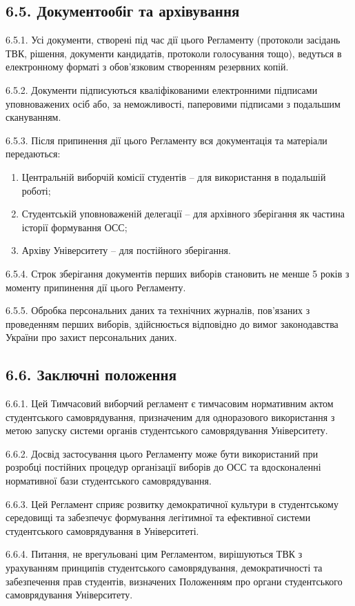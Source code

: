 \subsection*{6.5. Документообіг та архівування}
    6.5.1. Усі документи, створені під час дії цього Регламенту (протоколи засідань ТВК, рішення, документи кандидатів, протоколи голосування тощо), ведуться в електронному форматі з обов'язковим створенням резервних копій.

    6.5.2. Документи підписуються кваліфікованими електронними підписами уповноважених осіб або, за неможливості, паперовими підписами з подальшим скануванням.

    6.5.3. Після припинення дії цього Регламенту вся документація та матеріали передаються:

        \begin{enumerate}[label=\alph*)]
            \item Центральній виборчій комісії студентів -- для використання в подальшій роботі;
            \item Студентській уповноваженій делегації -- для архівного зберігання як частина історії формування ОСС;
            \item Архіву Університету -- для постійного зберігання.
        \end{enumerate}

    6.5.4. Строк зберігання документів перших виборів становить не менше 5 років з моменту припинення дії цього Регламенту.

    6.5.5. Обробка персональних даних та технічних журналів, пов'язаних з проведенням перших виборів, здійснюється відповідно до вимог законодавства України про захист персональних даних.

\subsection*{6.6. Заключні положення}
    6.6.1. Цей Тимчасовий виборчий регламент є тимчасовим нормативним актом студентського самоврядування, призначеним для одноразового використання з метою запуску системи органів студентського самоврядування Університету.

    6.6.2. Досвід застосування цього Регламенту може бути використаний при розробці постійних процедур організації виборів до ОСС та вдосконаленні нормативної бази студентського самоврядування.

    6.6.3. Цей Регламент сприяє розвитку демократичної культури в студентському середовищі та забезпечує формування легітимної та ефективної системи студентського самоврядування в Університеті.

    6.6.4. Питання, не врегульовані цим Регламентом, вирішуються ТВК з урахуванням принципів студентського самоврядування, демократичності та забезпечення прав студентів, визначених Положенням про органи студентського самоврядування Університету.